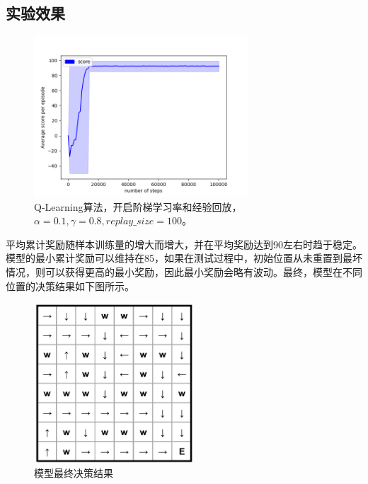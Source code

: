 \documentclass[a4paper,12pt]{article}
\begin{document}
\begin{CJK}{UTF8}{gbsn}
\section{实验效果}
\begin{figure}[h!]
	\centering
	\includegraphics[width=8cm,height=6cm]{./code/performance.png}
	\caption{Q-Learning算法，开启阶梯学习率和经验回放，$\alpha=0.1,\gamma=0.8,replay\_size=100$。}
	\label{performance}
\end{figure}
平均累计奖励随样本训练量的增大而增大，并在平均奖励达到90左右时趋于稳定。模型的最小累计奖励可以维持在85，如果在测试过程中，初始位置从未重置到最坏情况，则可以获得更高的最小奖励，因此最小奖励会略有波动。最终，模型在不同位置的决策结果如下图所示。
\begin{figure}[h!]
	\centering
	\includegraphics[width=6cm,height=6cm]{./code/result.png}
	\caption{模型最终决策结果}
	\label{performance}
\end{figure}


\end{CJK}
\end{document}
